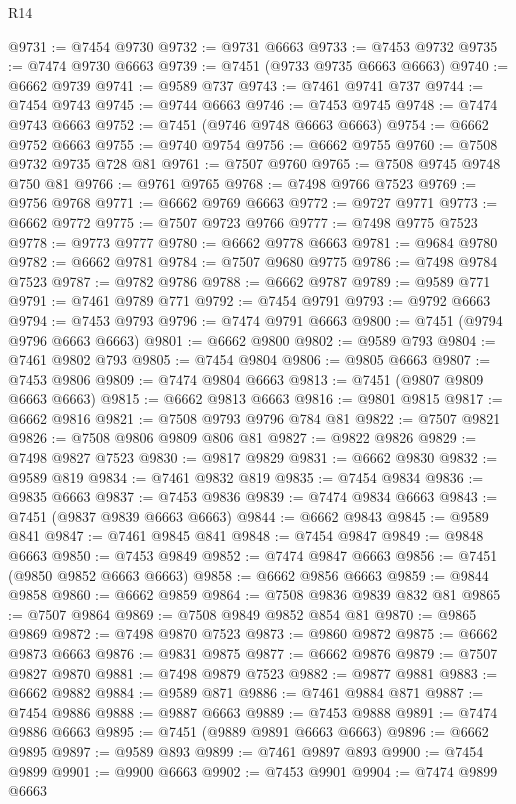\begin{lexlean}{R14}
\begin{coremodule}
@9731 := @7454 @9730
@9732 := @9731 @6663
@9733 := @7453 @9732
@9735 := @7474 @9730 @6663
@9739 := @7451 (@9733 @9735 @6663 @6663)
@9740 := @6662 @9739
@9741 := @9589 @737
@9743 := @7461 @9741 @737
@9744 := @7454 @9743
@9745 := @9744 @6663
@9746 := @7453 @9745
@9748 := @7474 @9743 @6663
@9752 := @7451 (@9746 @9748 @6663 @6663)
@9754 := @6662 @9752 @6663
@9755 := @9740 @9754
@9756 := @6662 @9755
@9760 := @7508 @9732 @9735 @728 @81
@9761 := @7507 @9760
@9765 := @7508 @9745 @9748 @750 @81
@9766 := @9761 @9765
@9768 := @7498 @9766 @7523
@9769 := @9756 @9768
@9771 := @6662 @9769 @6663
@9772 := @9727 @9771
@9773 := @6662 @9772
@9775 := @7507 @9723 @9766
@9777 := @7498 @9775 @7523
@9778 := @9773 @9777
@9780 := @6662 @9778 @6663
@9781 := @9684 @9780
@9782 := @6662 @9781
@9784 := @7507 @9680 @9775
@9786 := @7498 @9784 @7523
@9787 := @9782 @9786
@9788 := @6662 @9787
@9789 := @9589 @771
@9791 := @7461 @9789 @771
@9792 := @7454 @9791
@9793 := @9792 @6663
@9794 := @7453 @9793
@9796 := @7474 @9791 @6663
@9800 := @7451 (@9794 @9796 @6663 @6663)
@9801 := @6662 @9800
@9802 := @9589 @793
@9804 := @7461 @9802 @793
@9805 := @7454 @9804
@9806 := @9805 @6663
@9807 := @7453 @9806
@9809 := @7474 @9804 @6663
@9813 := @7451 (@9807 @9809 @6663 @6663)
@9815 := @6662 @9813 @6663
@9816 := @9801 @9815
@9817 := @6662 @9816
@9821 := @7508 @9793 @9796 @784 @81
@9822 := @7507 @9821
@9826 := @7508 @9806 @9809 @806 @81
@9827 := @9822 @9826
@9829 := @7498 @9827 @7523
@9830 := @9817 @9829
@9831 := @6662 @9830
@9832 := @9589 @819
@9834 := @7461 @9832 @819
@9835 := @7454 @9834
@9836 := @9835 @6663
@9837 := @7453 @9836
@9839 := @7474 @9834 @6663
@9843 := @7451 (@9837 @9839 @6663 @6663)
@9844 := @6662 @9843
@9845 := @9589 @841
@9847 := @7461 @9845 @841
@9848 := @7454 @9847
@9849 := @9848 @6663
@9850 := @7453 @9849
@9852 := @7474 @9847 @6663
@9856 := @7451 (@9850 @9852 @6663 @6663)
@9858 := @6662 @9856 @6663
@9859 := @9844 @9858
@9860 := @6662 @9859
@9864 := @7508 @9836 @9839 @832 @81
@9865 := @7507 @9864
@9869 := @7508 @9849 @9852 @854 @81
@9870 := @9865 @9869
@9872 := @7498 @9870 @7523
@9873 := @9860 @9872
@9875 := @6662 @9873 @6663
@9876 := @9831 @9875
@9877 := @6662 @9876
@9879 := @7507 @9827 @9870
@9881 := @7498 @9879 @7523
@9882 := @9877 @9881
@9883 := @6662 @9882
@9884 := @9589 @871
@9886 := @7461 @9884 @871
@9887 := @7454 @9886
@9888 := @9887 @6663
@9889 := @7453 @9888
@9891 := @7474 @9886 @6663
@9895 := @7451 (@9889 @9891 @6663 @6663)
@9896 := @6662 @9895
@9897 := @9589 @893
@9899 := @7461 @9897 @893
@9900 := @7454 @9899
@9901 := @9900 @6663
@9902 := @7453 @9901
@9904 := @7474 @9899 @6663

\end{coremodule}
\end{lexlean}
